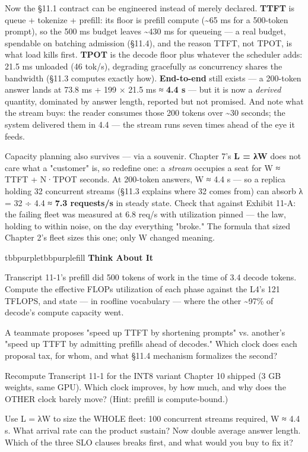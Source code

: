 Now the §11.1 contract can be engineered instead of merely declared. \textbf{TTFT} is queue + tokenize + prefill: its floor is prefill compute (\textasciitilde{}65 ms for a 500-token prompt), so the 500 ms budget leaves \textasciitilde{}430 ms for queueing — a real budget, spendable on batching admission (§11.4), and the reason TTFT, not TPOT, is what load kills first. \textbf{TPOT} is the decode floor plus whatever the scheduler adds: 21.5 ms unloaded (46 tok/s), degrading gracefully as concurrency shares the bandwidth (§11.3 computes exactly how). \textbf{End-to-end} still exists — a 200-token answer lands at 73.8 ms + 199 × 21.5 ms ≈ \textbf{4.4 s} — but it is now a \textit{derived} quantity, dominated by answer length, reported but not promised. And note what the stream buys: the reader consumes those 200 tokens over \textasciitilde{}30 seconds; the system delivered them in 4.4 — the stream runs seven times ahead of the eye it feeds.

Capacity planning also survives — via a souvenir. Chapter 7's \textbf{L = λW} does not care what a "customer" is, so redefine one: a \textit{stream} occupies a seat for W ≈ TTFT + N·TPOT seconds. At 200-token answers, W ≈ 4.4 s — so a replica holding 32 concurrent streams (§11.3 explains where 32 comes from) can absorb λ = 32 ÷ 4.4 ≈ \textbf{7.3 requests/s} in steady state. Check that against Exhibit 11-A: the failing fleet was measured at 6.8 req/s with utilization pinned — the law, holding to within noise, on the day everything "broke." The formula that sized Chapter 2's fleet sizes this one; only W changed meaning.

\begin{calloutbox}{tbbpurple}{tbbpurplefill}
{\normalsize\bfseries\color{tbbpurple}Think About It}\par\vspace{3pt}
\begin{tbbitemize}
  \item Transcript 11-1's prefill did 500 tokens of work in the time of 3.4 decode tokens. Compute the effective FLOPs utilization of each phase against the L4's 121 TFLOPS, and state — in roofline vocabulary — where the other \textasciitilde{}97\% of decode's compute capacity went.
  \item A teammate proposes "speed up TTFT by shortening prompts" vs. another's "speed up TTFT by admitting prefills ahead of decodes." Which clock does each proposal tax, for whom, and what §11.4 mechanism formalizes the second?
  \item Recompute Transcript 11-1 for the INT8 variant Chapter 10 shipped (3 GB weights, same GPU). Which clock improves, by how much, and why does the OTHER clock barely move? (Hint: prefill is compute-bound.)
  \item Use L = λW to size the WHOLE fleet: 100 concurrent streams required, W ≈ 4.4 s. What arrival rate can the product sustain? Now double average answer length. Which of the three SLO clauses breaks first, and what would you buy to fix it?
\end{tbbitemize}
\end{calloutbox}

